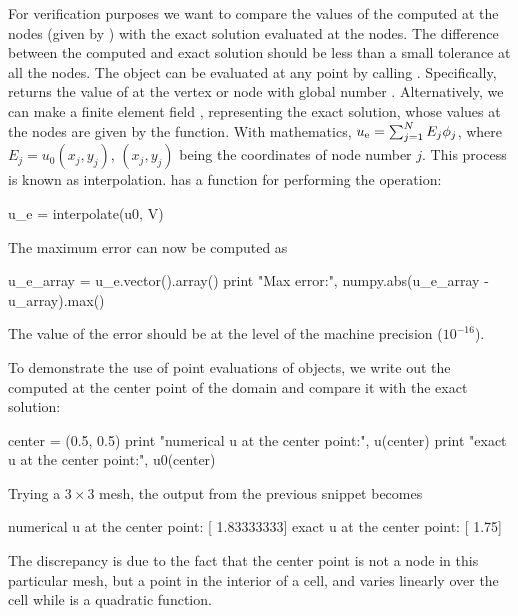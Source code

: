 For verification purposes we want to compare the values of the
computed  at the nodes (given by ) with the exact
solution  evaluated at the nodes.  The difference between the
computed and exact solution should be less than a small tolerance at
all the nodes. The  object  can be evaluated
at any point  by calling . Specifically,
 returns the value of  at the vertex or node
with global number .
Alternatively, we can make a finite element field , representing
the exact solution, whose values at the nodes are given by the
 function. With mathematics, $u_{\rm e} = \sum_{j=1}^N  E_j\phi_j$, where
$E_j=u_0(x_j,y_j)$, $(x_j,y_j)$ being the coordinates of node number $j$.
This process is known as interpolation.
\fenics{} has a function for performing the operation:
\begin{python}
u_e = interpolate(u0, V)
\end{python}
The maximum error can now be computed as
\begin{python}
u_e_array = u_e.vector().array()
print "Max error:", numpy.abs(u_e_array - u_array).max()
\end{python}
The value of the error should be at the level of the machine precision
($10^{-16}$).

To demonstrate the use of point evaluations of  objects,
we write out the computed  at the center point of the domain and
compare it with the exact solution:
\begin{python}
center = (0.5, 0.5)
print "numerical u at the center point:",  u(center)
print "exact     u at the center point:", u0(center)
\end{python}
Trying a $3\times 3$ mesh, the output from the previous snippet becomes
\begin{progoutput}
numerical u at the center point: [ 1.83333333]
exact     u at the center point: [ 1.75]
\end{progoutput}
\noindent
The discrepancy is due to the fact that the center point is not a node in
this particular mesh, but a point in the interior of a cell, and 
varies linearly over the cell while  is a quadratic function.

